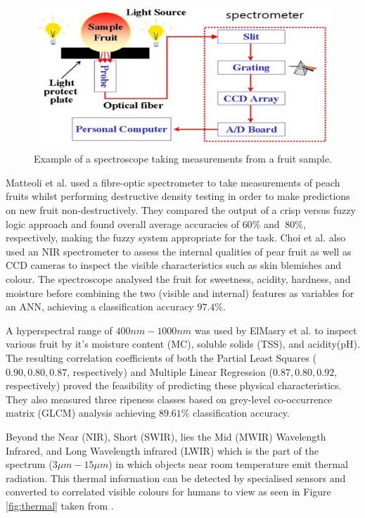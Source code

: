 \documentclass[fleqn,twoside,12pt]{report}
\begin{document}
\begin{figure}[h]
	\centering
	\includegraphics[width=0.9\linewidth]{spectroscope.png}
	\caption{Example of a spectroscope taking measurements from a fruit sample.}
	\label{fig:spectroscope}
\end{figure}%


Matteoli et al.\cite{matteoli} used a fibre-optic spectrometer to take measurements of peach fruits whilst performing destructive density testing in order to make predictions on new fruit non-destructively. They compared the output of a crisp versus fuzzy logic approach and found overall average accuracies of $60\%$ and $~80\%$, respectively, making the fuzzy system appropriate for the task. Choi et al.\cite{choi} also used an NIR spectrometer to assess the internal qualities of pear fruit as well as CCD cameras to inspect the visible characteristics such as skin blemishes and colour. The spectroscope analysed the fruit for sweetness, acidity, hardness, and moisture before combining the two (visible and internal) features as variables for an ANN, achieving a classification accuracy $97.4\%$.

A hyperspectral range of $400nm-1000nm$ was used by ElMasry et al.\cite{elmasry2} to inspect various fruit by it's moisture content (MC), soluble solids (TSS), and acidity(pH). The resulting correlation coefficients of both the Partial Least Squares ($0.90, 0.80, 0.87$, respectively) and Multiple Linear Regression ($0.87, 0.80, 0.92$, respectively) proved the feasibility of predicting these physical characteristics. They also measured three ripeness classes based on grey-level co-occurrence matrix (GLCM) analysis achieving $89.61\%$ classification accuracy.


Beyond the Near (NIR), Short (SWIR), lies the Mid (MWIR) Wavelength Infrared, and  Long Wavelength infrared (LWIR) which is the part of the spectrum ($3\mu m-15\mu m$) in which objects near room temperature emit thermal radiation. This thermal information can be detected by specialised sensors and converted to correlated visible colours for humans to view as seen in Figure \ref{fig:thermal} taken from \cite{baranowski}.
\end{document}
